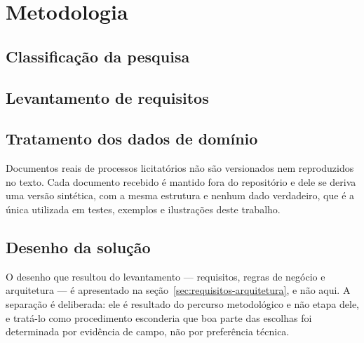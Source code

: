 \section{Metodologia}
\label{sec:metodologia}


\subsection{Classificação da pesquisa}


\subsection{Levantamento de requisitos}


\subsection{Tratamento dos dados de domínio}

Documentos reais de processos licitatórios não são versionados nem reproduzidos
no texto. Cada documento recebido é mantido fora do repositório e dele se deriva
uma versão sintética, com a mesma estrutura e nenhum dado verdadeiro, que é a
única utilizada em testes, exemplos e ilustrações deste trabalho.


\subsection{Desenho da solução}

O desenho que resultou do levantamento --- requisitos, regras de negócio e
arquitetura --- é apresentado na seção~\ref{sec:requisitos-arquitetura}, e não
aqui. A separação é deliberada: ele é resultado do percurso metodológico e não
etapa dele, e tratá-lo como procedimento esconderia que boa parte das escolhas
foi determinada por evidência de campo, não por preferência técnica.

